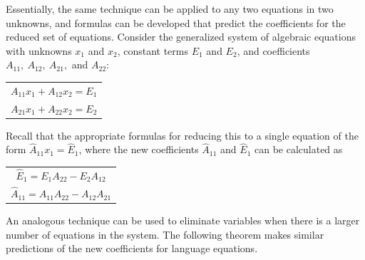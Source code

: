 Essentially, the same technique can be applied to any two equations in two
unknowns, and formulas can be developed that predict the coefficients for the
reduced set of equations. Consider the generalized system of algebraic equations
with unknowns $x_1$ and $x_2$, constant terms $E_1$ and $E_2$, and coefficients
$A_{11},\ A_{12},\ A_{21},$ and $A_{22}$:
\begin{center}\begin{tabular}{c}
$A_{11}x_1 + A_{12}x_2 = E_1$ \\
$A_{21}x_1 + A_{22}x_2 = E_2$
\end{tabular}\end{center}
Recall that the appropriate formulas for reducing this to a single equation of
the form $\hat{A}_{11}x_1 = \hat{E}_1$, where the new coefficients
$\hat{A}_{11}$ and $\hat{E}_1$ can be calculated as
\begin{center}\begin{tabular}{c}
$\hat{E}_1 = E_1A_{22} - E_2A_{12}$ \\
$\hat{A}_{11} = A_{11}A_{22} - A_{12}A_{21}$
\end{tabular}\end{center}
An analogous technique can be used to eliminate variables when there is a larger
number of equations in the system. The following theorem makes similar
predictions of the new coefficients for language equations.


